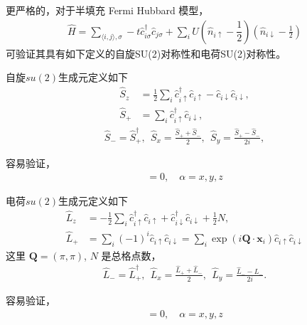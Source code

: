 
更严格的，对于半填充 Fermi Hubbard 模型，
\begin{align}
    \hat{H} = \sum_{\langle i,j\rangle,\sigma} -t\hat{c}_{i\sigma}^{\dagger}\hat{c}_{j\sigma} + \sum_{i} U \left(\hat{n}_{i\uparrow}-\dfrac{1}{2}\right)\left(\hat{n}_{i\downarrow}-\frac{1}{2}\right) 
\end{align}
可验证其具有如下定义的自旋SU(2)对称性和电荷SU(2)对称性。

\begin{definition}\label{def:spinsu2}
自旋$su(2)$生成元定义如下
\begin{align}\label{eq:spinsu2}
    \hat{S}_z &= \frac{1}{2}\sum_{i}\hat{c}_{i\uparrow}^{\dagger}\hat{c}_{i\uparrow}-\hat{c}_{i\downarrow}\hat{c}_{i\downarrow}, \\  
    \hat{S}_{+} &= \sum_{i}\hat{c}_{i\uparrow}^{\dagger}\hat{c}_{i\downarrow}, 
\end{align}
\begin{align}
    \hat{S}_{-} = \hat{S}_{+}^{\dagger}, \  \  
    \hat{S}_{x} = \frac{\hat{S}_{+}+\hat{S}_{-}}{2}, \  \  
    \hat{S}_{y} = \frac{\hat{S}_{+}-\hat{S}_{-}}{2i},
\end{align}
\end{definition}
容易验证，
\begin{align}
[\hat{H}, \hat{S}_{\alpha}]=0, \quad \alpha=x,y,z
\end{align}

\begin{definition}\label{def:spinsu2}
电荷$su(2)$生成元定义如下
\begin{align}
    \hat{L}_z &= -\frac{1}{2}\sum_{i}\hat{c}_{i\uparrow}^{\dagger}\hat{c}_{i\uparrow}+\hat{c}_{i\downarrow}^{\dagger}\hat{c}_{i\downarrow}+\frac{1}{2}N, \\ 
    \hat{L}_{+} &= \sum_{i}(-1)^i\hat{c}_{i\uparrow}\hat{c}_{i\downarrow} = \sum_{i}\exp(i\mathbf{Q}\cdot\mathbf{x}_i)\hat{c}_{i\uparrow}\hat{c}_{i\downarrow}
\end{align}
这里 $\mathbf{Q} = (\pi, \pi)$, $N$ 是总格点数，
\begin{align}
    \hat{L}_{-} = \hat{L}_{+}^{\dagger}, \  \  
    \hat{L}_{x} = \frac{\hat{L}_{+}+\hat{L}_{-}}{2}, \  \  
    \hat{L}_{y} = \frac{\hat{L}_{-}-\hat{L}_{-}}{2i}. 
\end{align}
\end{definition}
容易验证，
\begin{align}
[\hat{H}, \hat{L}_{\alpha}]=0, \quad \alpha=x,y,z
\end{align}


